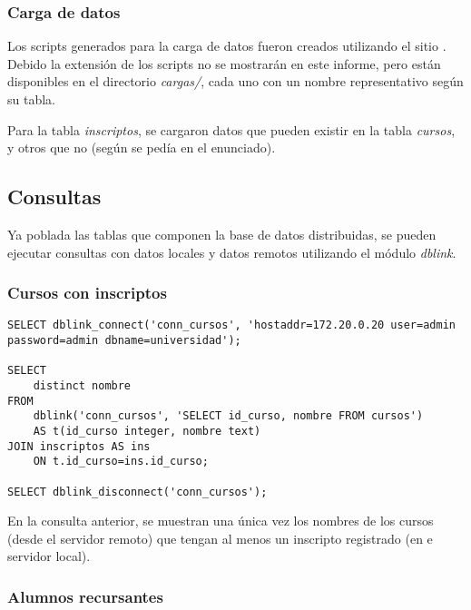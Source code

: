 \subsubsection{Carga de datos}

Los scripts generados para la carga de datos fueron creados utilizando el sitio \autocite{data}. Debido la extensión de los scripts no se mostrarán en este informe, pero están disponibles en el directorio \emph{cargas/}, cada uno con un nombre representativo según su tabla.

Para la tabla \emph{inscriptos}, se cargaron datos que pueden existir en la tabla \emph{cursos}, y otros que no (según se pedía en el enunciado).  

\subsection{Consultas}

Ya poblada las tablas que componen la base de datos distribuidas, se pueden ejecutar consultas con datos locales y datos remotos utilizando el módulo \emph{dblink}. 

\subsubsection{Cursos con inscriptos}


\vspace*{5mm}
\begin{lstlisting}[title=Cursos con algún inscripto (el script es \emph{cursos\_con\_inscriptos.sql})]
SELECT dblink_connect('conn_cursos', 'hostaddr=172.20.0.20 user=admin password=admin dbname=universidad');

SELECT 
    distinct nombre 
FROM 
    dblink('conn_cursos', 'SELECT id_curso, nombre FROM cursos') 
    AS t(id_curso integer, nombre text)
JOIN inscriptos AS ins 
    ON t.id_curso=ins.id_curso;

SELECT dblink_disconnect('conn_cursos');
\end{lstlisting}

En la consulta anterior, se muestran una única vez los nombres de los cursos (desde el servidor remoto) que tengan al menos un inscripto registrado (en e servidor local).


\subsubsection{Alumnos recursantes}


